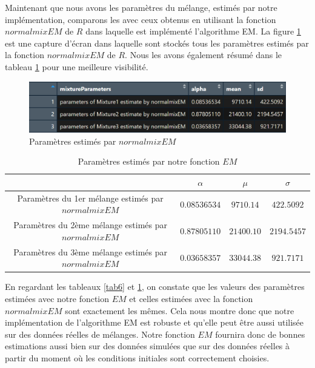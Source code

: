 \documentclass[a4paper,french,10pt]{article}
\begin{document}
\newpage

Maintenant que nous avons les paramètres du mélange, estimés par notre implémentation, comparons les avec ceux obtenus en utilisant la fonction $normalmixEM$ de $R$ dans laquelle est implémenté l'algorithme EM. La figure \ref{paramEstLib} est une capture d'écran dans laquelle sont stockés tous les paramètres estimés par la fonction $normalmixEM$ de $R$. Nous les avons également résumé dans le tableau \ref{tab7} pour une meilleure visibilité.  

\begin{figure}[htp] 
	\centering
	\includegraphics[scale=0.8]{images/paramEstLib.png}
	\caption{Paramètres estimés par $normalmixEM$}
	\label{paramEstLib}
\end{figure}

\begin{table}[htp]
	\center
	\begin{tabular}{|c||c|c|c|}
		\hline
		& $\alpha$ & $\mu$ & $\sigma$\\
		\hline
		Paramètres du 1er mélange estimés par $normalmixEM$ & $0.08536534$ & $9710.14$ & $422.5092$ \\
		\hline
		Paramètres du 2ème mélange estimés par $normalmixEM$ & $0.87805110$ & $21400.10$ & $2194.5457$ \\
		\hline
		Paramètres du 3ème mélange estimés par $normalmixEM$ & $0.03658357$ & $33044.38$ & $921.7171$ \\
		\hline
	\end{tabular}
	\caption{Paramètres estimés par notre fonction $EM$}
	\label{tab7}
\end{table}

En regardant les tableaux \ref{tab6} et \ref{tab7}, on constate que les valeurs des paramètres estimées avec notre fonction $EM$ et celles estimées avec la fonction $normalmixEM$ sont exactement les mêmes. Cela nous montre donc que notre implémentation de l'algorithme EM est robuste et qu'elle peut être aussi utilisée sur des données réelles de mélanges. Notre fonction $EM$ fournira donc de bonnes estimations aussi bien sur des données simulées que sur des données réelles à partir du moment où les conditions initiales sont correctement choisies.
\end{document}

